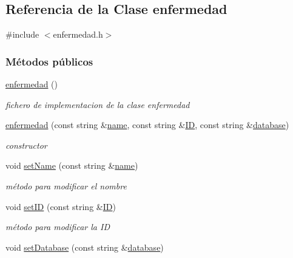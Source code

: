\hypertarget{classenfermedad}{}\subsection{Referencia de la Clase enfermedad}
\label{classenfermedad}


{\ttfamily \#include $<$enfermedad.\+h$>$}

\subsubsection*{Métodos públicos}
\begin{DoxyCompactItemize}
\item 
\hyperlink{classenfermedad_a60eb5e620b0bf9a53d4f0980031aeefd}{enfermedad} ()
\begin{DoxyCompactList}\small\item\em fichero de implementacion de la clase enfermedad \end{DoxyCompactList}\item 
\hyperlink{classenfermedad_a7caef55b00a31ce18191ceaba81ed20c}{enfermedad} (const string \&\hyperlink{classenfermedad_ad7c4204057028a73bde6022678c6813e}{name}, const string \&\hyperlink{classenfermedad_a689cdbd469ecc28e045bda2f62a229d2}{ID}, const string \&\hyperlink{classenfermedad_a3684b7ec850d4c9357dd21bdd5e02803}{database})
\begin{DoxyCompactList}\small\item\em constructor \end{DoxyCompactList}\item 
void \hyperlink{classenfermedad_a18f621d13de01c0b06a05757ddd8a087}{set\+Name} (const string \&\hyperlink{classenfermedad_ad7c4204057028a73bde6022678c6813e}{name})
\begin{DoxyCompactList}\small\item\em método para modificar el nombre \end{DoxyCompactList}\item 
void \hyperlink{classenfermedad_a5ad52bdce8de9ac4fe25b460dc699af4}{set\+ID} (const string \&\hyperlink{classenfermedad_a689cdbd469ecc28e045bda2f62a229d2}{ID})
\begin{DoxyCompactList}\small\item\em método para modificar la ID \end{DoxyCompactList}\item 
void \hyperlink{classenfermedad_ac1f009307d52232420a72264e9c2ce3f}{set\+Database} (const string \&\hyperlink{classenfermedad_a3684b7ec850d4c9357dd21bdd5e02803}{database})

\end{DoxyCompactItemize}
